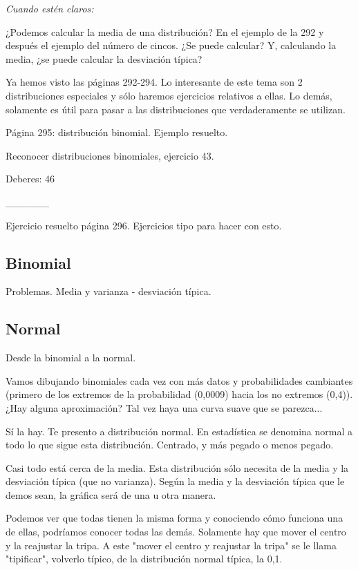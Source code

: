 \textit{Cuando estén claros:} 

¿Podemos calcular la media de una distribución? En el ejemplo de la 292 y después el ejemplo del número de cincos. ¿Se puede calcular? Y, calculando la media, ¿se puede calcular la desviación típica?

Ya hemos visto las páginas 292-294. Lo interesante de este tema son 2 distribuciones especiales y sólo haremos ejercicios relativos a ellas. Lo demás, solamente es útil para pasar a las distribuciones que verdaderamente se utilizan.

Página 295: distribución binomial. Ejemplo resuelto.

Reconocer distribuciones binomiales, ejercicio 43.

Deberes: 46


______

Ejercicio resuelto página 296. Ejercicios tipo para hacer con esto.

\subsection{Binomial}

Problemas. Media y varianza - desviación típica.

\subsection{Normal}

Desde la binomial a la normal.


Vamos dibujando binomiales cada vez con más datos y probabilidades cambiantes (primero de los extremos de la probabilidad (0,0009) hacia los no extremos (0,4)). ¿Hay alguna aproximación? Tal vez haya una curva suave que se parezca...

Sí la hay.  Te presento a distribución normal. En estadística se denomina normal a todo lo que sigue esta distribución. Centrado, y más pegado o menos pegado.

Casi todo está cerca de la media. Esta distribución sólo necesita de la media y la desviación típica (que no varianza). Según la media y la desviación típica que le demos sean, la gráfica será de una u otra manera.

Podemos ver que todas tienen la misma forma y conociendo cómo funciona una de ellas, podríamos conocer todas las demás. Solamente hay que mover el centro y la reajustar la tripa. A este "mover el centro y reajustar la tripa" se le llama "tipificar", volverlo típico, de la distribución normal típica, la 0,1. 

